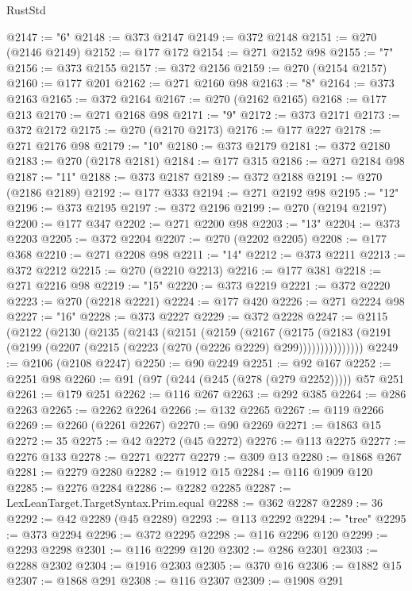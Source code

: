 \begin{lexlean}{RustStd}
\begin{coremodule}
@2147 := "6"
@2148 := @373 @2147
@2149 := @372 @2148
@2151 := @270 (@2146 @2149)
@2152 := @177 @172
@2154 := @271 @2152 @98
@2155 := "7"
@2156 := @373 @2155
@2157 := @372 @2156
@2159 := @270 (@2154 @2157)
@2160 := @177 @201
@2162 := @271 @2160 @98
@2163 := "8"
@2164 := @373 @2163
@2165 := @372 @2164
@2167 := @270 (@2162 @2165)
@2168 := @177 @213
@2170 := @271 @2168 @98
@2171 := "9"
@2172 := @373 @2171
@2173 := @372 @2172
@2175 := @270 (@2170 @2173)
@2176 := @177 @227
@2178 := @271 @2176 @98
@2179 := "10"
@2180 := @373 @2179
@2181 := @372 @2180
@2183 := @270 (@2178 @2181)
@2184 := @177 @315
@2186 := @271 @2184 @98
@2187 := "11"
@2188 := @373 @2187
@2189 := @372 @2188
@2191 := @270 (@2186 @2189)
@2192 := @177 @333
@2194 := @271 @2192 @98
@2195 := "12"
@2196 := @373 @2195
@2197 := @372 @2196
@2199 := @270 (@2194 @2197)
@2200 := @177 @347
@2202 := @271 @2200 @98
@2203 := "13"
@2204 := @373 @2203
@2205 := @372 @2204
@2207 := @270 (@2202 @2205)
@2208 := @177 @368
@2210 := @271 @2208 @98
@2211 := "14"
@2212 := @373 @2211
@2213 := @372 @2212
@2215 := @270 (@2210 @2213)
@2216 := @177 @381
@2218 := @271 @2216 @98
@2219 := "15"
@2220 := @373 @2219
@2221 := @372 @2220
@2223 := @270 (@2218 @2221)
@2224 := @177 @420
@2226 := @271 @2224 @98
@2227 := "16"
@2228 := @373 @2227
@2229 := @372 @2228
@2247 := @2115
    (@2122
      (@2130
        (@2135
          (@2143
            (@2151
              (@2159
                (@2167
                  (@2175
                    (@2183
                      (@2191 (@2199 (@2207 (@2215 (@2223 (@270 (@2226 @2229) @299)))))))))))))))
@2249 := @2106 (@2108 @2247)
@2250 := @90 @2249
@2251 := @92 @167
@2252 := @2251 @98
@2260 := @91 (@97 (@244 (@245 (@278 (@279 @2252))))) @57 @251
@2261 := @179 @251
@2262 := @116 @267
@2263 := @292 @385
@2264 := @286 @2263
@2265 := @2262 @2264
@2266 := @132 @2265
@2267 := @119 @2266
@2269 := @2260 (@2261 @2267)
@2270 := @90 @2269
@2271 := @1863 @15
@2272 := 35
@2275 := @42 @2272 (@45 @2272)
@2276 := @113 @2275
@2277 := @2276 @133
@2278 := @2271 @2277
@2279 := @309 @13
@2280 := @1868 @267
@2281 := @2279 @2280
@2282 := @1912 @15
@2284 := @116 @1909 @120
@2285 := @2276 @2284
@2286 := @2282 @2285
@2287 := LexLeanTarget.TargetSyntax.Prim.equal
@2288 := @362 @2287
@2289 := 36
@2292 := @42 @2289 (@45 @2289)
@2293 := @113 @2292
@2294 := "tree"
@2295 := @373 @2294
@2296 := @372 @2295
@2298 := @116 @2296 @120
@2299 := @2293 @2298
@2301 := @116 @2299 @120
@2302 := @286 @2301
@2303 := @2288 @2302
@2304 := @1916 @2303
@2305 := @370 @16
@2306 := @1882 @15
@2307 := @1868 @291
@2308 := @116 @2307
@2309 := @1908 @291

\end{coremodule}
\end{lexlean}
